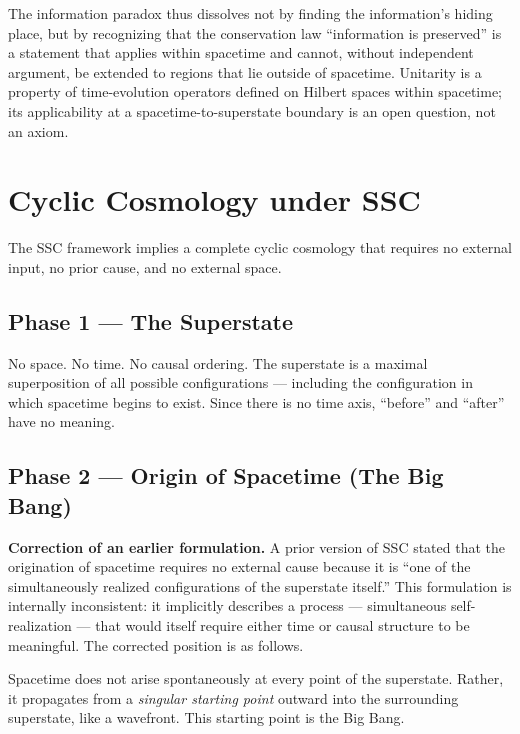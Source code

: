 \documentclass[12pt,a4paper]{article}
\begin{document}
The information paradox thus dissolves not by finding the information's
hiding place, but by recognizing that the conservation law
``information is preserved'' is a statement that applies within
spacetime and cannot, without independent argument, be extended to
regions that lie outside of spacetime.  Unitarity is a property of
time-evolution operators defined on Hilbert spaces within spacetime;
its applicability at a spacetime-to-superstate boundary is an open
question, not an axiom.

\section{Cyclic Cosmology under SSC}
\label{sec:cyclic}

The SSC framework implies a complete cyclic cosmology that requires no
external input, no prior cause, and no external space.

\subsection*{Phase 1 — The Superstate}

No space.  No time.  No causal ordering.  The superstate is a maximal
superposition of all possible configurations — including the
configuration in which spacetime begins to exist.  Since there is no
time axis, ``before'' and ``after'' have no meaning.

\subsection*{Phase 2 — Origin of Spacetime (The Big Bang)}

\textbf{Correction of an earlier formulation.}  A prior version of
SSC stated that the origination of spacetime requires no external cause
because it is ``one of the simultaneously realized configurations of
the superstate itself.''  This formulation is internally inconsistent:
it implicitly describes a process — simultaneous self-realization —
that would itself require either time or causal structure to be
meaningful.  The corrected position is as follows.

Spacetime does not arise spontaneously at every point of the superstate.
Rather, it propagates from a \emph{singular starting point} outward
into the surrounding superstate, like a wavefront.  This starting point
is the Big Bang.
\end{document}
